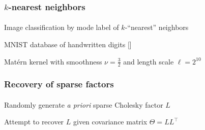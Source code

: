 \documentclass{beamer}                             %
\newcommand*{\CM}{\Theta}
\newenvironment{wideitemize}
  {\itemize\setlength{\itemsep}{0.5cm}}
  {\enditemize}
\begin{document}
\begin{frame}
\frametitle{\( k \)-nearest neighbors}
\framesubtitle{}

\begin{wideitemize}
  \item Image classification by mode label of \( k \)-``nearest'' neighbors
  \item MNIST database of handwritten digits [\cite{lecun1998gradientbased}]
  \item Mat{\'e}rn kernel with smoothness \( \nu =
    \frac{3}{2} \) and length scale \( \ell = 2^{10} \)
\end{wideitemize}


\begin{figure}[t]
  \centering
  
  \label{fig:mnist}
\end{figure}
\end{frame}

\begin{frame}
\frametitle{Recovery of sparse factors}
\framesubtitle{}

\begin{wideitemize}
  \item Randomly generate \textit{a priori} sparse Cholesky factor \( L \)
  \item Attempt to recover \( L \) given
    covariance matrix \( \CM = L L^{\top} \)
\end{wideitemize}


\begin{figure}[t]
  \centering
  
\end{figure}
\end{frame}
\end{document}
